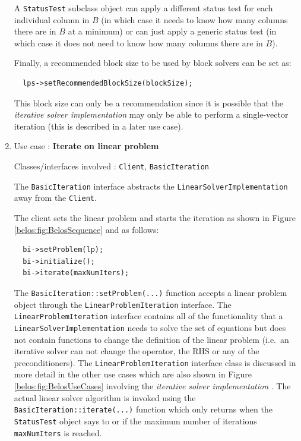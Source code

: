 \documentclass[pdf,ps2pdf,11pt]{SANDreport}
\begin{document}
\begin{enumerate}
A {}\texttt{Status\-Test} subclass object can apply a different status
test for each individual column in $B$ (in which case it needs to know
how many columns there are in $B$ at a minimum) or can just apply a
generic status test (in which case it does not need to know how many
columns there are in $B$).

Finally, a recommended block size to be used by block solvers can be
set as:

{\scriptsize\begin{verbatim}
  lps->setRecommendedBlockSize(blockSize);
\end{verbatim}}

This block size can only be a recommendation since it is possible that
the {}\textit{iterative solver implementation} may only be able to
perform a single-vector iteration (this is described in a later use
case).

{}\item Use case : \textbf{Iterate on linear problem}

{}\noindent{}Classes/interfaces involved : {}\texttt{Client},
{}\texttt{Basic\-Iteration}

The {}\texttt{Basic\-Iteration} interface abstracts the
{}\texttt{Linear\-Solver\-Implementation} away from the
{}\texttt{Client}.

The client sets the linear problem and starts the iteration as shown
in Figure {}\ref{belos:fig:BelosSequence} and as follows:

{\scriptsize\begin{verbatim}
  bi->setProblem(lp);
  bi->initialize();
  bi->iterate(maxNumIters);
\end{verbatim}}

The {}\texttt{Basic\-Iteration::\-set\-Problem(...)} function accepts
a linear problem object through the
{}\texttt{Linear\-Problem\-Iteration} interface.  The
{}\texttt{Linear\-Problem\-Iteration} interface contains all of the
functionality that a {}\texttt{Linear\-Solver\-Implementation} needs
to solve the set of equations but does not contain functions to change
the definition of the linear problem (i.e.~an iterative solver can not
change the operator, the RHS or any of the preconditioners).  The
{}\texttt{Linear\-Problem\-Iteration} interface class is discussed in
more detail in the other use cases which are also shown in Figure
{}\ref{belos:fig:BelosUseCases} involving the {}\textit{iterative
solver implementation} .  The actual linear solver algorithm is
invoked using the {}\texttt{Basic\-Iteration::\-iterate(...)} function
which only returns when the {}\texttt{Status\-Test} object says to or
if the maximum number of iterations {}\texttt{maxNumIters} is reached.


\end{enumerate}
\end{document}
